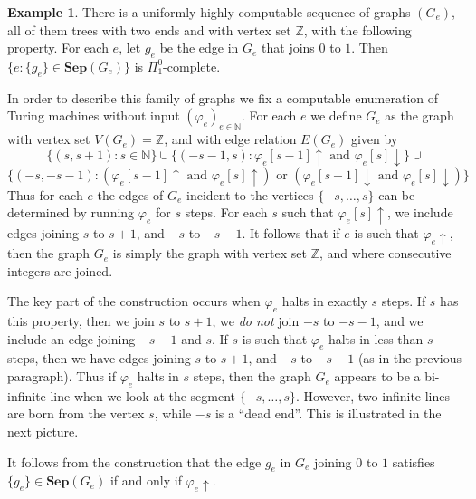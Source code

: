 \documentclass[10pt,A4]{amsart}
\theoremstyle{definition}
\newtheorem{ex}[thm]{Example}
\theoremstyle{definition}
\newcommand{\N}{\mathbb{N}}
\newcommand{\Z}{\mathbb{Z}}
\newcommand{\sep}[1]{\mathbf{Sep}({#1})}
\renewcommand{\mid}{ : }
\begin{document}
\begin{ex}\label{ex:grafo-con-colita}
    There is a uniformly highly computable sequence of graphs $(G_e)$, all of them trees with two ends and with vertex set $\Z$, with the following property. For each $e$, let $g_e$ be the edge in $G_e$ that joins $0$ to $1$. Then $\{e : \{g_e\}\in\sep{G_e}\}$ is $\Pi_1^0$-complete.
    
    In order to describe this family of graphs we fix a computable enumeration of Turing machines without input $(\varphi_e)_{e \in \N}$. For each $e$ we define $G_e$ as the graph with vertex set $V(G_e) = \Z$, and with edge relation $E(G_e)$ given by
    \[\{(s,s+1)\mid s\in \N\} \cup 
    \{(-s-1,s)\mid \varphi_{e}[s-1] \uparrow \text{ and } \varphi_{e}[s] \downarrow  \}\cup\]\[
     \{(-s,-s-1)\mid (\varphi_{e}[s-1]\uparrow \text{ and } \varphi_{e}[s] \uparrow) \text{ or } (\varphi_{e}[s-1]\downarrow \text{ and } \varphi_{e}[s] \downarrow)  \}\]
Thus for each $e$ the edges of $G_e$ incident to the vertices $\{-s,\dots,s\}$ can be determined by running $\varphi_e$ for $s$ steps.  For each $s$ such that $\varphi_{e}[s]\uparrow$,  we include edges joining $s$ to $s+1$, and $-s$ to $-s-1$. It follows that if $e$ is such that $\varphi_e\uparrow$, then the graph $G_e$ is simply the graph with vertex set $\Z$, and where consecutive integers are joined. 

The key part of the construction occurs when $\varphi_{e}$ halts in exactly $s$ steps. If $s$ has this property, then we join $s$ to $s+1$, we \textit{do not} join $-s$ to $-s-1$, and we include an edge joining $-s-1$ and $s$. If $s$ is such that $\varphi_{e}$ halts in less than $s$ steps, then we have edges joining $s$ to $s+1$, and $-s$ to $-s-1$ (as in the previous paragraph). Thus  if $\varphi_e$ halts in $s$ steps, then the graph $G_e$ appears to be a bi-infinite line when we look at the segment $\{-s,\dots,s\}$. However, two infinite lines are born from the vertex $s$, while $-s$ is a ``dead end''. This is illustrated in the next picture. 
  \begin{tcolorbox}
        \begin{center}
        \end{center}
    \end{tcolorbox}
It follows from the construction that  the edge  $g_e$ in $G_e$ joining $0$ to $1$ satisfies $\{g_e\}\in\sep{G_e}$ if and only if $\varphi_e\uparrow$.
\end{ex} 
\end{document}
